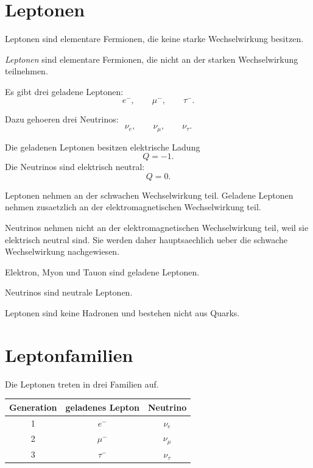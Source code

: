 \section{Leptonen}

Leptonen sind elementare Fermionen, die keine starke Wechselwirkung besitzen.

\begin{definitionbox}
\emph{Leptonen} sind elementare Fermionen, die nicht an der starken Wechselwirkung
teilnehmen.
\end{definitionbox}

\begin{conceptbox}
Es gibt drei geladene Leptonen:
\[
    e^-,
    \qquad
    \mu^-,
    \qquad
    \tau^-.
\]

Dazu gehoeren drei Neutrinos:
\[
    \nu_e,
    \qquad
    \nu_\mu,
    \qquad
    \nu_\tau.
\]
\end{conceptbox}

\begin{notebox}
Die geladenen Leptonen besitzen elektrische Ladung
\[
    Q=-1.
\]
Die Neutrinos sind elektrisch neutral:
\[
    Q=0.
\]
\end{notebox}

\begin{conceptbox}
Leptonen nehmen an der schwachen Wechselwirkung teil.
Geladene Leptonen nehmen zusaetzlich an der elektromagnetischen Wechselwirkung teil.

Neutrinos nehmen nicht an der elektromagnetischen Wechselwirkung teil, weil sie
elektrisch neutral sind.
Sie werden daher hauptsaechlich ueber die schwache Wechselwirkung nachgewiesen.
\end{conceptbox}

\begin{examtipbox}
Elektron, Myon und Tauon sind geladene Leptonen.

Neutrinos sind neutrale Leptonen.

Leptonen sind keine Hadronen und bestehen nicht aus Quarks.
\end{examtipbox}

\section{Leptonfamilien}

Die Leptonen treten in drei Familien auf.

\begin{center}
\begin{tabular}{|c|c|c|}
\hline
Generation & geladenes Lepton & Neutrino \\
\hline
1 & $e^-$ & $\nu_e$ \\
\hline
2 & $\mu^-$ & $\nu_\mu$ \\
\hline
3 & $\tau^-$ & $\nu_\tau$ \\
\hline
\end{tabular}
\end{center}

